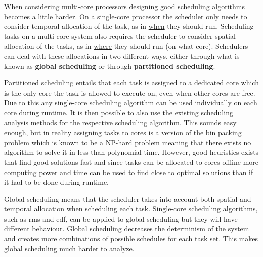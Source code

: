 \documentclass{kththesis}
\begin{document}
When considering multi-core processors designing good scheduling algorithms becomes a little harder. On a single-core
processor the scheduler only needs to consider temporal allocation of the task, as in
\underline{when} they should run. Scheduling tasks on a multi-core system also requires the
scheduler to consider spatial allocation of the tasks, as in \underline{where} they should run
(on what core). Schedulers can deal with these allocations in two different ways, either through
what is known as \textbf{global scheduling} or through \textbf{partitioned scheduling}. 

Partitioned scheduling entails that each task is assigned to a dedicated core which is the only core
the task is allowed to execute on, even when other cores are free. Due to this any single-core
scheduling algorithm can be used individually on each core during runtime. It is then possible to
also use the existing scheduling analysis methods for the respective scheduling algorithm. This
sounds easy enough, but in reality assigning tasks to cores is a version of the bin packing problem
which is known to be a NP-hard problem meaning that there exists no algorithm to solve it in less
than polynomial time. However, good heuristics
\parencite{johnson_fast_1974}\parencite{coffman_application_1978} exists that find good solutions
fast and since tasks can be allocated to cores offline more computing power and time can be used to
find close to optimal solutions than if it had to be done during runtime.

Global scheduling means that the scheduler takes into account both spatial and temporal allocation
when scheduling each task. Single-core scheduling algorithms, such as \acrshort{rms} and
\acrshort{edf}, can be applied to global scheduling but they will have different behaviour. Global
scheduling decreases the determinism of the system and creates more combinations of possible
schedules for each task set. This makes global scheduling much harder to analyze.
\end{document}
